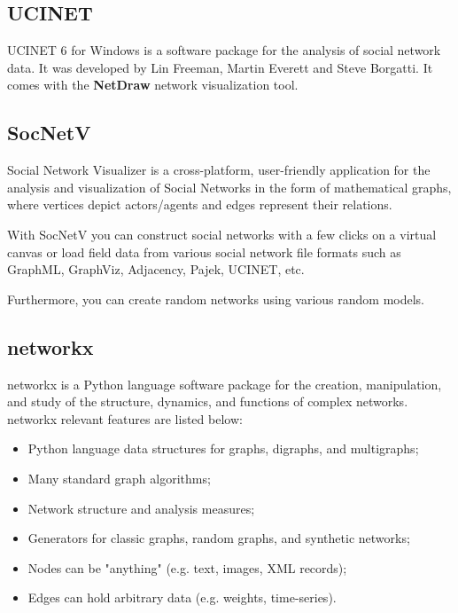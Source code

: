 \subsection{UCINET}

\indent \indent UCINET 6 \citep{ucinet-software} for Windows is a software package for the analysis of social network data. It was developed by Lin Freeman, Martin Everett and Steve Borgatti. It comes with the \textbf{NetDraw} \citep{borgatti2002netdraw} network visualization tool.

\subsection{SocNetV}

\indent \indent Social Network Visualizer \citep{socnetv} is a cross-platform, user-friendly application for the analysis and visualization of Social Networks in the form of mathematical graphs, where vertices depict actors/agents and edges represent their relations.

With SocNetV you can construct social networks with a few clicks on a virtual canvas or load field data from various social network file formats such as GraphML, GraphViz, Adjacency, Pajek, UCINET, etc.

Furthermore, you can create random networks using various random models.

\subsection{networkx}
\indent \indent networkx \citep{hagberg2013networkx} is a Python language software package for the creation, manipulation, and study of the structure, dynamics, and functions of complex networks. networkx relevant features are listed below:
\begin{itemize}
    \item Python language data structures for graphs, digraphs, and multigraphs;
    \item Many standard graph algorithms;
    \item Network structure and analysis measures;
    \item Generators for classic graphs, random graphs, and synthetic networks;
    \item Nodes can be "anything" (e.g. text, images, XML records);
    \item Edges can hold arbitrary data (e.g. weights, time-series).
\end{itemize}

